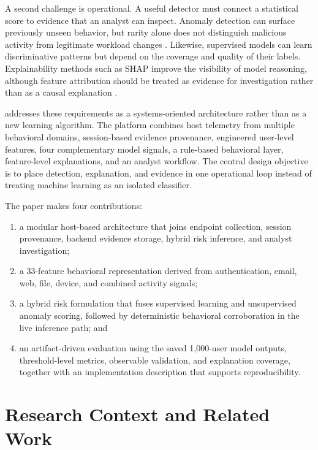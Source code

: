 A second challenge is operational. A useful detector must connect a statistical score to evidence that an analyst can inspect. Anomaly detection can surface previously unseen behavior, but rarity alone does not distinguish malicious activity from legitimate workload changes \cite{chandola2009}. Likewise, supervised models can learn discriminative patterns but depend on the coverage and quality of their labels. Explainability methods such as SHAP improve the visibility of model reasoning, although feature attribution should be treated as evidence for investigation rather than as a causal explanation \cite{lundberg2017,alketbi2025}.

\ThreatTron addresses these requirements as a systems-oriented architecture rather than as a new learning algorithm. The platform combines host telemetry from multiple behavioral domains, session-based evidence provenance, engineered user-level features, four complementary model signals, a rule-based behavioral layer, feature-level explanations, and an analyst workflow. The central design objective is to place detection, explanation, and evidence in one operational loop instead of treating machine learning as an isolated classifier.

The paper makes four contributions:
\begin{enumerate}
    \item a modular host-based architecture that joins endpoint collection, session provenance, backend evidence storage, hybrid risk inference, and analyst investigation;
    \item a 33-feature behavioral representation derived from authentication, email, web, file, device, and combined activity signals;
    \item a hybrid risk formulation that fuses supervised learning and unsupervised anomaly scoring, followed by deterministic behavioral corroboration in the live inference path; and
    \item an artifact-driven evaluation using the saved 1,000-user model outputs, threshold-level metrics, observable validation, and explanation coverage, together with an implementation description that supports reproducibility.
\end{enumerate}

\section{Research Context and Related Work}
